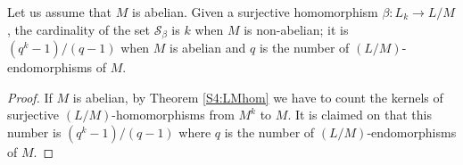     \begin{theorem}
        \label{cardSA}
        Let us assume that $M$ is abelian. Given a surjective homomorphism $\beta \colon L_k \rightarrow L/M$, the cardinality of the set $\mathscr{S}_\beta$ is $k$ when $M$ is non-abelian; it is $(q^k-1)/(q-1)$ when $M$ is abelian and $q$ is the number of $(L/M)$-endomorphisms of $M$.
    \end{theorem}

    \begin{proof}
        If $M$ is abelian, by Theorem \ref{S4:LMhom} we have to count the kernels of surjective $(L/M)$-homomorphisms from $M^k$ to $M$. It is claimed on \cite[Lemma 2.5]{DallaVoltaFGNMGAPQ} that this number is $(q^k-1)/(q-1)$ where $q$ is the number of $(L/M)$-endomorphisms of $M$.
    \end{proof}




